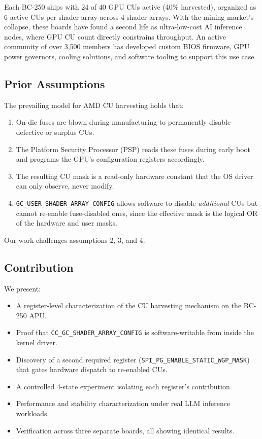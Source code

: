 \documentclass[11pt,twocolumn]{article}
\begin{document}
Each BC-250 ships with 24 of 40 GPU CUs active (40\% harvested), organized as 6 active CUs per shader array across 4 shader arrays. With the mining market's collapse, these boards have found a second life as ultra-low-cost AI inference nodes, where GPU CU count directly constrains throughput. An active community of over 3,500 members has developed custom BIOS firmware, GPU power governors, cooling solutions, and software tooling to support this use case.

\subsection{Prior Assumptions}

The prevailing model for AMD CU harvesting holds that:

\begin{enumerate}[nosep]
    \item On-die fuses are blown during manufacturing to permanently disable defective or surplus CUs.
    \item The Platform Security Processor (PSP) reads these fuses during early boot and programs the GPU's configuration registers accordingly.
    \item The resulting CU mask is a read-only hardware constant that the OS driver can only observe, never modify.
    \item \texttt{GC\_USER\_SHADER\_ARRAY\_CONFIG} allows software to disable \textit{additional} CUs but cannot re-enable fuse-disabled ones, since the effective mask is the logical OR of the hardware and user masks.
\end{enumerate}

Our work challenges assumptions 2, 3, and 4.

\subsection{Contribution}

We present:
\begin{itemize}[nosep]
    \item A register-level characterization of the CU harvesting mechanism on the BC-250 APU.
    \item Proof that \texttt{CC\_GC\_SHADER\_ARRAY\_CONFIG} is software-writable from inside the kernel driver.
    \item Discovery of a second required register (\texttt{SPI\_PG\_ENABLE\_STATIC\_WGP\_MASK}) that gates hardware dispatch to re-enabled CUs.
    \item A controlled 4-state experiment isolating each register's contribution.
    \item Performance and stability characterization under real LLM inference workloads.
    \item Verification across three separate boards, all showing identical results.
\end{itemize}
\end{document}
